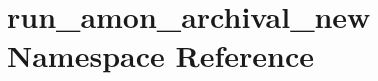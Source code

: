 \hypertarget{namespacerun__amon__archival__new}{\section{run\-\_\-amon\-\_\-archival\-\_\-new Namespace Reference}
\label{namespacerun__amon__archival__new}
}

